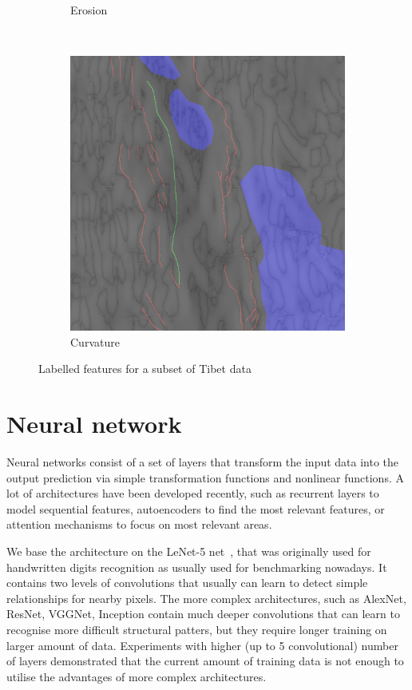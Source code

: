 \documentclass[11pt,a4paper]{article}
\begin{document}
\begin{figure}[t]
\begin{subfigure}[b]{0.18\textwidth}
        \caption{Erosion}
        \label{fig:features_erosion}
    \end{subfigure}
    ~
    \begin{subfigure}[b]{0.18\textwidth}
        \includegraphics[width=\textwidth]{graphics/data/0/features_curve.png}
        \caption{Curvature}
        \label{fig:features_curve}
    \end{subfigure}
    \caption{Labelled features for a subset of Tibet data}\label{fig:features}
\end{figure}

\section{Neural network}
Neural networks consist of a set of layers that transform the input data into the output prediction via simple
transformation functions and nonlinear functions. A lot of architectures have been developed recently, such as recurrent
layers to model sequential features, autoencoders to find the most relevant features, or attention mechanisms to focus
on most relevant areas.

We base the architecture on the LeNet-5 net~\cite{lecun1998gradient}, that was originally used for handwritten digits
recognition as usually used for benchmarking nowadays. It contains two levels of convolutions that usually can learn to
detect simple relationships for nearby pixels. The more complex architectures, such as AlexNet, ResNet, VGGNet, Inception
contain much deeper convolutions that can learn to recognise more difficult structural patters, but they require longer
training on larger amount of data. Experiments with higher (up to 5 convolutional) number of layers demonstrated that
the current amount of training data is not enough to utilise the advantages of more complex architectures.
\end{document}
